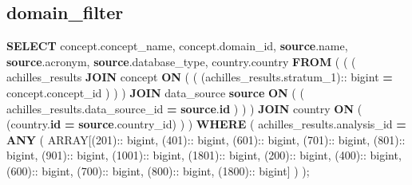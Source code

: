 \documentclass[
]{book}
\newenvironment{Shaded}{\begin{snugshade}}{\end{snugshade}}
\newcommand{\DataTypeTok}[1]{\textcolor[rgb]{0.13,0.29,0.53}{#1}}
\newcommand{\DecValTok}[1]{\textcolor[rgb]{0.00,0.00,0.81}{#1}}
\newcommand{\KeywordTok}[1]{\textcolor[rgb]{0.13,0.29,0.53}{\textbf{#1}}}
\newcommand{\NormalTok}[1]{#1}
\newcommand{\OperatorTok}[1]{\textcolor[rgb]{0.81,0.36,0.00}{\textbf{#1}}}
\begin{document}
\hypertarget{domain_filter}{%
\subsection*{domain\_filter}\label{domain_filter}}

\begin{Shaded}
\begin{Highlighting}[]
\KeywordTok{SELECT}
\NormalTok{  concept.concept\_name,}
\NormalTok{  concept.domain\_id,}
  \KeywordTok{source}\NormalTok{.name,}
  \KeywordTok{source}\NormalTok{.acronym,}
  \KeywordTok{source}\NormalTok{.database\_type,}
\NormalTok{  country.country}
\KeywordTok{FROM}
\NormalTok{  (}
\NormalTok{    (}
\NormalTok{      (}
\NormalTok{        achilles\_results}
        \KeywordTok{JOIN}\NormalTok{ concept }\KeywordTok{ON}\NormalTok{ (}
\NormalTok{          (}
\NormalTok{            (achilles\_results.stratum\_1):: bigint}
            \OperatorTok{=}
\NormalTok{            concept.concept\_id}
\NormalTok{          )}
\NormalTok{        )}
\NormalTok{      )}
      \KeywordTok{JOIN}\NormalTok{ data\_source }\KeywordTok{source} \KeywordTok{ON}\NormalTok{ (}
\NormalTok{        (}
\NormalTok{          achilles\_results.data\_source\_id }\OperatorTok{=} \KeywordTok{source}\NormalTok{.}\KeywordTok{id}
\NormalTok{        )}
\NormalTok{      )}
\NormalTok{    )}
    \KeywordTok{JOIN}\NormalTok{ country }\KeywordTok{ON}\NormalTok{ (}
\NormalTok{      (country.}\KeywordTok{id} \OperatorTok{=} \KeywordTok{source}\NormalTok{.country\_id)}
\NormalTok{    )}
\NormalTok{  )}
\KeywordTok{WHERE}
\NormalTok{  (}
\NormalTok{    achilles\_results.analysis\_id }\OperatorTok{=} \KeywordTok{ANY}\NormalTok{ (}
      \DataTypeTok{ARRAY}\NormalTok{[(}\DecValTok{201}\NormalTok{):: bigint,}
\NormalTok{      (}\DecValTok{401}\NormalTok{):: bigint,}
\NormalTok{      (}\DecValTok{601}\NormalTok{):: bigint,}
\NormalTok{      (}\DecValTok{701}\NormalTok{):: bigint,}
\NormalTok{      (}\DecValTok{801}\NormalTok{):: bigint,}
\NormalTok{      (}\DecValTok{901}\NormalTok{):: bigint,}
\NormalTok{      (}\DecValTok{1001}\NormalTok{):: bigint,}
\NormalTok{      (}\DecValTok{1801}\NormalTok{):: bigint,}
\NormalTok{      (}\DecValTok{200}\NormalTok{):: bigint,}
\NormalTok{      (}\DecValTok{400}\NormalTok{):: bigint,}
\NormalTok{      (}\DecValTok{600}\NormalTok{):: bigint,}
\NormalTok{      (}\DecValTok{700}\NormalTok{):: bigint,}
\NormalTok{      (}\DecValTok{800}\NormalTok{):: bigint,}
\NormalTok{      (}\DecValTok{1800}\NormalTok{):: bigint]}
\NormalTok{    )}
\NormalTok{  );}
\end{Highlighting}
\end{Shaded}
\end{document}
